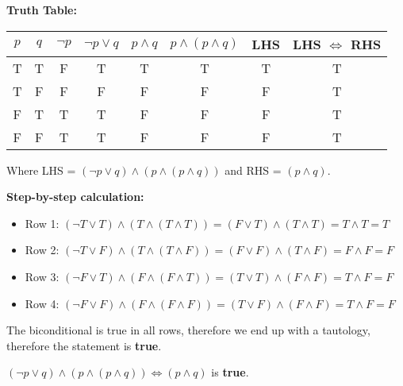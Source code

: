 \documentclass{article}
\begin{document}
\textbf{Truth Table:}

\begin{center}
    \begin{tabular}{|c|c|c|c|c|c|c|c|}
    \hline
    $p$ & $q$ & $\neg p$ & $\neg p \vee q$ & $p \wedge q$ & $p \wedge (p \wedge q)$ & LHS & LHS $\Leftrightarrow$ RHS \\
    \hline
    T & T & F & T & T & T & T & T \\
    T & F & F & F & F & F & F & T \\
    F & T & T & T & F & F & F & T \\
    F & F & T & T & F & F & F & T \\
    \hline
    \end{tabular}
    \end{center}
    
    Where LHS = $(\neg p \vee q) \wedge (p \wedge (p \wedge q))$ and RHS = $(p \wedge q)$.
    
    \textbf{Step-by-step calculation:}
    \begin{itemize}
    \item Row 1: $(\neg T \vee T) \wedge (T \wedge (T \wedge T)) = (F \vee T) \wedge (T \wedge T) = T \wedge T = T$
    \item Row 2: $(\neg T \vee F) \wedge (T \wedge (T \wedge F)) = (F \vee F) \wedge (T \wedge F) = F \wedge F = F$
    \item Row 3: $(\neg F \vee T) \wedge (F \wedge (F \wedge T)) = (T \vee T) \wedge (F \wedge F) = T \wedge F = F$
    \item Row 4: $(\neg F \vee F) \wedge (F \wedge (F \wedge F)) = (T \vee F) \wedge (F \wedge F) = T \wedge F = F$
    \end{itemize}
    

    The biconditional is true in all rows, therefore we end up with a tautology, therefore the statement is \textbf{true}.

$(\neg p \vee q) \wedge (p \wedge (p \wedge q)) \Leftrightarrow (p \wedge q)$ is \textbf{true}.
    
\end{document}
